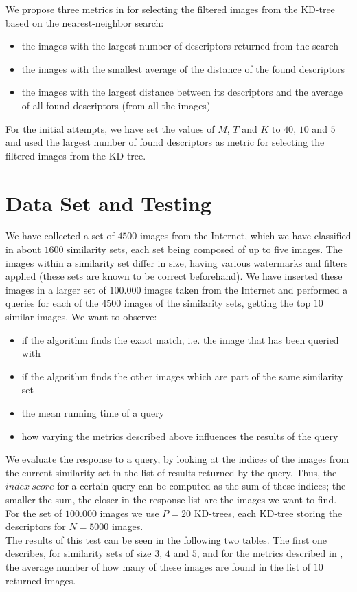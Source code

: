 \documentclass[conference]{IEEEtran}
\begin{document}
We propose three metrics in for selecting the filtered images from the KD-tree based on the nearest-neighbor search:
\begin{itemize}
	\item the images with the largest number of descriptors returned from the search
	\item the images with the smallest average of the distance of the found descriptors
	\item the images with the largest distance between its descriptors and the average of all found descriptors (from all the images)
\end{itemize}

For the initial attempts, we have set the values of $M$, $T$ and $K$ to $40$, $10$ and $5$ and used the largest number of found descriptors as metric for selecting the filtered images from the KD-tree.\\

\section{Data Set and Testing}

We have collected a set of $4500$ images from the Internet, which we have classified in about $1600$ similarity sets, each set being composed of up to five images. The images within a similarity set differ in size, having various watermarks and filters applied (these sets are known to be correct beforehand). We have inserted these images in a larger set of $100.000$ images taken from the Internet and performed a queries for each of the $4500$ images of the similarity sets, getting the top $10$ similar images. We want to observe:
\begin{itemize}
	\item if the algorithm finds the exact match, i.e. the image that has been queried with
	\item if the algorithm finds the other images which are part of the same similarity set
	\item the mean running time of a query
	\item how varying the metrics described above influences the results of the query
\end{itemize}

We evaluate the response to a query, by looking at the indices of the images from the current similarity set in the list of results returned by the query. Thus, the $index\ score$ for a certain query can be computed as the sum of these indices; the smaller the sum, the closer in the response list are the images we want to find. \\
For the set of $100.000$ images we use $P=20$ KD-trees, each KD-tree storing the descriptors for $N=5000$ images.\\
The results of this test can be seen in the following two tables. The first one describes, for similarity sets of size $3$, $4$ and $5$, and for the metrics described in , the average number of how many of these images are found in the list of $10$ returned images.\\
\end{document}
